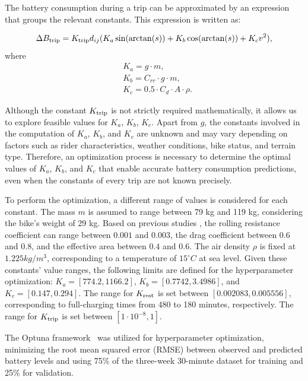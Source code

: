       The battery consumption during a trip can be approximated by an expression that groups the relevant constants. This expression is written as:

        \begin{equation}
          \Delta B_{\rm trip}=K_{\rm trip} d_{ij}(K_a \sin(\arctan(s))+ K_b \cos(\arctan(s)) + K_c v^2), \label{consumption}
        \end{equation}
      where
        \begin{align*}
          & K_a=g \cdot m, \\
          & K_b={C_{rr}} \cdot g \cdot m, \\
          & K_c=0.5 \cdot C_d \cdot A \cdot \rho.
        \end{align*}

      Although the constant $K_{\rm trip}$ is not strictly required mathematically, it allows us to explore feasible values for $K_a$, $K_b$, $K_c$. Apart from $g$, the constants involved in the computation of $K_a$, $K_b$, and $K_c$ are unknown and may vary depending on factors such as rider characteristics, weather conditions, bike status, and terrain type. Therefore, an optimization process is necessary to determine the optimal values of $K_a$, $K_b$, and $K_c$ that enable accurate battery consumption predictions, even when the constants of every trip are not known precisely.

      To perform the optimization, a different range of values is considered for each constant. The mass $m$ is assumed to range between 79 kg and 119 kg, considering the bike's weight of 29 kg. Based on previous studies \cite{Steyn2014, Bertucci2013}, the rolling resistance coefficient can range between $0.001$ and $0.003$, the drag coefficient between $0.6$ and $0.8$, and the effective area between $0.4$ and $0.6$. The air density $\rho$ is fixed at $1.225kg/m^3$, corresponding to a temperature of $15^{\circ}C$ at sea level. Given these constants' value ranges, the following limits are defined for the hyperparameter optimization: $K_a = [774.2, 1166.2]$, $K_b = [0.7742, 3.4986]$, and $K_c = [0.147, 0.294]$. The range for $K_{\rm rest}$ is set between $[0.002083, 0.005556]$, corresponding to full-charging times from 480 to 180 minutes, respectively. The range for $K_{\rm trip}$ is set between $[1 \cdot 10^{-8},1]$.

      The Optuna framework~\cite{Optuna2019} was utilized for hyperparameter optimization, minimizing the root mean squared error (RMSE) between observed and predicted battery levels and using 75\% of the three-week 30-minute dataset for training and 25\% for validation.